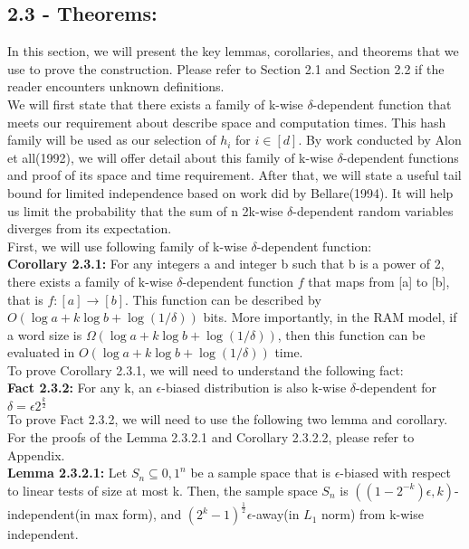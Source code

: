 \documentclass[a4paper, english]{paper}
\begin{document}
	\subsection{2.3 - Theorems:}
	In this section, we will present the key lemmas, corollaries, and theorems that we use to prove the construction. Please refer to Section 2.1 and Section 2.2 if the reader encounters unknown definitions. \\
	\indent We will first state that there exists a family of k-wise $\delta$-dependent function that meets our requirement about describe space and computation times. This hash family will be used as our selection of $h_i$ for $i\in[d]$. By work conducted by Alon et all(1992), we will offer detail about this family of k-wise $\delta$-dependent functions and proof of its space and time requirement. After that, we will state a useful tail bound for limited independence based on work did by Bellare(1994). It will help us limit the probability that the sum of n 2k-wise $\delta$-dependent random variables diverges from its expectation. \\

 First, we will use following family of k-wise $\delta$-dependent function:\\
	\noindent\textbf{Corollary 2.3.1:} For any integers a and integer b such that b is a power of 2, there exists a family of k-wise $\delta$-dependent function $f$ that maps from [a] to [b], that is $f: [a] \rightarrow [b]$. This function can be described by $O(\log a + k\log b+ \log(1/\delta))$ bits. More importantly, in the RAM model, if a word size is $\Omega(\log a + k\log b+ \log(1/\delta))$, then this function can be evaluated in $O(\log a + k\log b+ \log(1/\delta))$ time. \\

 To prove Corollary 2.3.1, we will need to understand the following fact:\\	
	\noindent\textbf{Fact 2.3.2:} For any k, an $\epsilon$-biased distribution is also k-wise $\delta$-dependent for $\delta=\epsilon2^{\frac k2}$\\
	
 To prove Fact 2.3.2, we will need to use the following two lemma and corollary. For the proofs of the Lemma 2.3.2.1 and Corollary 2.3.2.2, please refer to Appendix. \\
	\noindent\textbf{Lemma 2.3.2.1:} Let $S_n\subseteq{0,1}^n$ be a sample space that is $\epsilon$-biased with respect to linear tests of size at most k. Then, the sample space $S_n$ is $((1-2^{-k})\epsilon,k)$-independent(in max form), and $(2^k-1)^{\frac12}\epsilon$-away(in $L_1$ norm) from k-wise independent.\\
	
\end{document}
